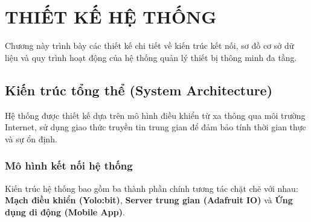 \section{THIẾT KẾ HỆ THỐNG}

Chương này trình bày các thiết kế chi tiết về kiến trúc kết nối, sơ đồ cơ sở dữ liệu và quy trình hoạt động của hệ thống quản lý thiết bị thông minh đa tầng.

\subsection{Kiến trúc tổng thể (System Architecture)}

Hệ thống được thiết kế dựa trên mô hình điều khiển từ xa thông qua môi trường Internet, sử dụng giao thức truyền tin trung gian để đảm bảo tính thời gian thực và sự ổn định.

\subsubsection{Mô hình kết nối hệ thống}
Kiến trúc hệ thống bao gồm ba thành phần chính tương tác chặt chẽ với nhau: \textbf{Mạch điều khiển (Yolo:bit)}, \textbf{Server trung gian (Adafruit IO)} và \textbf{Ứng dụng di động (Mobile App)}.

